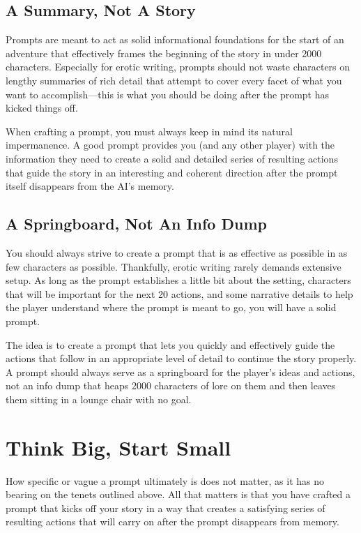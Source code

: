 ﻿\documentclass[Coomer-main.tex]{subfiles}
\begin{document}
\subsection{A Summary, Not A Story}

Prompts are meant to act as solid informational foundations for the start of an adventure that effectively frames the beginning of the story in under 2000 characters. Especially for erotic writing, prompts should not waste characters on lengthy summaries of rich detail that attempt to cover every facet of what you want to accomplish—this is what you should be doing after the prompt has kicked things off.

When crafting a prompt, you must always keep in mind its natural impermanence. A good prompt provides you (and any other player) with the information they need to create a solid and detailed series of resulting actions that guide the story in an interesting and coherent direction after the prompt itself disappears from the AI's memory.

\subsection{A Springboard, Not An Info Dump}

You should always strive to create a prompt that is as effective as possible in as few characters as possible. Thankfully, erotic writing rarely demands extensive setup. As long as the prompt establishes a little bit about the setting, characters that will be important for the next 20 actions, and some narrative details to help the player understand where the prompt is meant to go, you will have a solid prompt.

The idea is to create a prompt that lets you quickly and effectively guide the actions that follow in an appropriate level of detail to continue the story properly. A prompt should always serve as a springboard for the player's ideas and actions, not an info dump that heaps 2000 characters of lore on them and then leaves them sitting in a lounge chair with no goal.

\section{Think Big, Start Small}

How specific or vague a prompt ultimately is does not matter, as it has no bearing on the tenets outlined above. All that matters is that you have crafted a prompt that kicks off your story in a way that creates a satisfying series of resulting actions that will carry on after the prompt disappears from memory.
\end{document}
